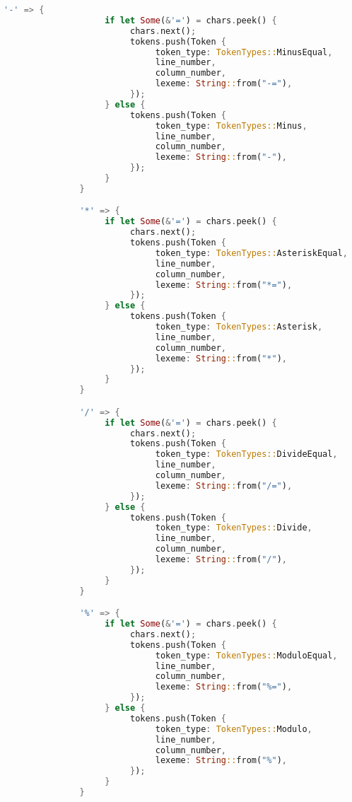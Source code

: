 \documentclass[12pt]{article}
\begin{document}
{\begin{lstlisting}[language=Rust]
               '-' => {
                    if let Some(&'=') = chars.peek() {
                         chars.next();
                         tokens.push(Token {
                              token_type: TokenTypes::MinusEqual,
                              line_number,
                              column_number,
                              lexeme: String::from("-="),
                         });
                    } else {
                         tokens.push(Token {
                              token_type: TokenTypes::Minus,
                              line_number,
                              column_number,
                              lexeme: String::from("-"),
                         });
                    }
               }

               '*' => {
                    if let Some(&'=') = chars.peek() {
                         chars.next();
                         tokens.push(Token {
                              token_type: TokenTypes::AsteriskEqual,
                              line_number,
                              column_number,
                              lexeme: String::from("*="),
                         });
                    } else {
                         tokens.push(Token {
                              token_type: TokenTypes::Asterisk,
                              line_number,
                              column_number,
                              lexeme: String::from("*"),
                         });
                    }
               }

               '/' => {
                    if let Some(&'=') = chars.peek() {
                         chars.next();
                         tokens.push(Token {
                              token_type: TokenTypes::DivideEqual,
                              line_number,
                              column_number,
                              lexeme: String::from("/="),
                         });
                    } else {
                         tokens.push(Token {
                              token_type: TokenTypes::Divide,
                              line_number,
                              column_number,
                              lexeme: String::from("/"),
                         });
                    }
               }

               '%' => {
                    if let Some(&'=') = chars.peek() {
                         chars.next();
                         tokens.push(Token {
                              token_type: TokenTypes::ModuloEqual,
                              line_number,
                              column_number,
                              lexeme: String::from("%="),
                         });
                    } else {
                         tokens.push(Token {
                              token_type: TokenTypes::Modulo,
                              line_number,
                              column_number,
                              lexeme: String::from("%"),
                         });
                    }
               }


\end{lstlisting}}
\end{document}
